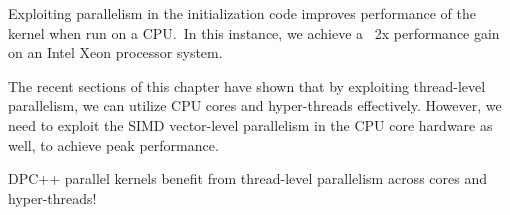 Exploiting parallelism in the initialization code improves performance of the kernel when run on a CPU. In this instance, we achieve a ~2x performance gain on an Intel Xeon processor system.\par

The recent sections of this chapter have shown that by exploiting thread-level parallelism, we can utilize CPU cores and hyper-threads effectively. However, we need to exploit the SIMD vector-level parallelism in the CPU core hardware as well, to achieve peak performance.\par

\begin{tcolorbox}[colback=blue!5!white,colframe=blue!75!black]
DPC++ parallel kernels benefit from thread-level parallelism across cores and hyper-threads!
\end{tcolorbox}





